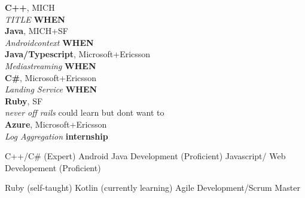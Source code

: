 \documentclass[margin,line]{res}
\begin{document}
\begin{resume}
{\bf C++}, MICH\\
{\em TITLE} \hfill {\bf  WHEN}\\

{\bf Java}, MICH+SF\\
{\em Androidcontext} \hfill {\bf WHEN }\\

{\bf Java/Typescript}, Microsoft+Ericsson\\
{\em Mediastreaming } \hfill {\bf WHEN}\\

{\bf {C\#}}, Microsoft+Ericsson\\
{\em Landing Service} \hfill {\bf  WHEN}\\

{\bf Ruby}, SF\\
{\em never off rails} \hfill could learn but dont want to\\

{\bf {Azure}}, Microsoft+Ericsson\\
{\em Log Aggregation} \hfill {\bf internship}\\
{\em }

C++/C\# (Expert)
Android Java Development (Proficient)
Javascript/ Web Developement (Proficient) 

Ruby (self-taught)
Kotlin (currently learning)
Agile Development/Scrum Master

\end{resume}
\end{document}
